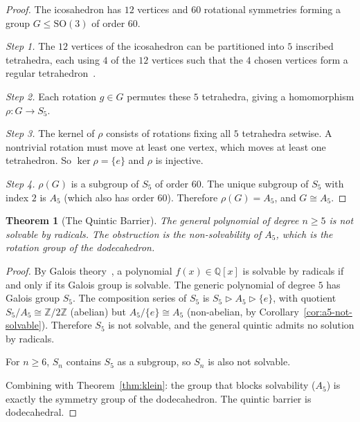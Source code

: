 \documentclass[11pt,a4paper]{article}
\theoremstyle{plain}
\newtheorem{theorem}{Theorem}[section]
\theoremstyle{definition}
\newcommand{\Z}{\mathbb{Z}}
\newcommand{\Q}{\mathbb{Q}}
\begin{document}
\begin{proof}
The icosahedron has $12$ vertices and $60$ rotational symmetries forming
a group $G \le \mathrm{SO}(3)$ of order $60$.

\emph{Step 1.}  The $12$ vertices of the icosahedron can be partitioned
into $5$ inscribed tetrahedra, each using $4$ of the $12$ vertices
such that the $4$ chosen vertices form a regular
tetrahedron~\cite{klein1884,coxeter}.

\emph{Step 2.}  Each rotation $g \in G$ permutes these $5$ tetrahedra,
giving a homomorphism $\rho : G \to S_{5}$.

\emph{Step 3.}  The kernel of $\rho$ consists of rotations fixing all $5$
tetrahedra setwise.  A nontrivial rotation must move at least one vertex,
which moves at least one tetrahedron.  So $\ker\rho = \{e\}$ and
$\rho$ is injective.

\emph{Step 4.}  $\rho(G)$ is a subgroup of $S_{5}$ of order $60$.  The
unique subgroup of $S_{5}$ with index $2$ is $A_{5}$ (which also has order
$60$).  Therefore $\rho(G) = A_{5}$, and $G \cong A_{5}$.
\end{proof}

\begin{theorem}[The Quintic Barrier]\label{thm:quintic}
The general polynomial of degree $n \ge 5$ is not solvable by radicals.
The obstruction is the non-solvability of $A_{5}$, which is the rotation
group of the dodecahedron.
\end{theorem}

\begin{proof}
By Galois theory~\cite{galois1832}, a polynomial $f(x) \in \Q[x]$ is
solvable by radicals if and only if its Galois group is solvable.  The
generic polynomial of degree $5$ has Galois group $S_{5}$.  The
composition series of $S_{5}$ is $S_{5} \rhd A_{5} \rhd \{e\}$, with
quotient $S_{5}/A_{5} \cong \Z/2\Z$ (abelian) but $A_{5}/\{e\}
\cong A_{5}$ (non-abelian, by Corollary~\ref{cor:a5-not-solvable}).
Therefore $S_{5}$ is not solvable, and the general quintic admits no
solution by radicals.

For $n \ge 6$, $S_{n}$ contains $S_{5}$ as a subgroup, so $S_{n}$ is
also not solvable.

Combining with Theorem~\ref{thm:klein}: the group that blocks
solvability ($A_{5}$) is exactly the symmetry group of the dodecahedron.
The quintic barrier is dodecahedral.
\end{proof}
\end{document}
